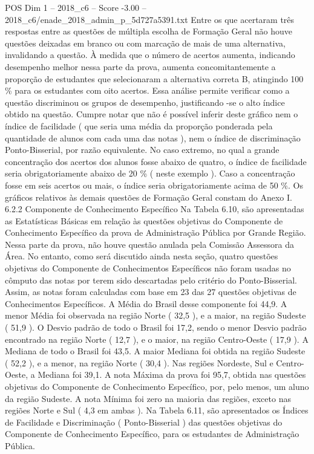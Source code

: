 \begin{textsample}{POS Dim 1 – 2018\_c6 – Score -3.00 – 2018\_c6/enade\_2018\_admin\_p\_5d727a5391.txt}
Entre os que acertaram três respostas entre as questões de múltipla escolha de Formação Geral não houve questões deixadas em branco ou com marcação de mais de uma alternativa, invalidando a questão.
À medida que o número de acertos aumenta, indicando desempenho melhor nessa parte da prova, aumenta concomitantemente a proporção de estudantes que selecionaram a alternativa correta B, atingindo 100 \% para os estudantes com oito acertos.
Essa análise permite verificar como a questão discriminou os grupos de desempenho, justificando -se o alto índice obtido na questão.
Cumpre notar que não é possível inferir deste gráfico nem o índice de facilidade ( que seria uma média da proporção ponderada pela quantidade de alunos com cada uma das notas ), nem o índice de discriminação Ponto-Bisserial, por razão equivalente.
No caso extremo, no qual a grande concentração dos acertos dos alunos fosse abaixo de quatro, o índice de facilidade seria obrigatoriamente abaixo de 20 \% ( neste exemplo ).
Caso a concentração fosse em seis acertos ou mais, o índice seria obrigatoriamente acima de 50 \%.
Os gráficos relativos às demais questões de Formação Geral constam do Anexo I. 6.2.2 Componente de Conhecimento Específico Na Tabela 6.10, são apresentadas as Estatísticas Básicas em relação às questões objetivas do Componente de Conhecimento Específico da prova de Administração Pública por Grande Região.
Nessa parte da prova, não houve questão anulada pela Comissão Assessora da Área.
No entanto, como será discutido ainda nesta seção, quatro questões objetivas do Componente de Conhecimentos Específicos não foram usadas no cômputo das notas por terem sido descartadas pelo critério do Ponto-Bisserial.
Assim, as notas foram calculadas com base em 23 das 27 questões objetivas de Conhecimentos Específicos.
A Média do Brasil desse componente foi 44,9.
A menor Média foi observada na região Norte ( 32,5 ), e a maior, na região Sudeste ( 51,9 ).
O Desvio padrão de todo o Brasil foi 17,2, sendo o menor Desvio padrão encontrado na região Norte ( 12,7 ), e o maior, na região Centro-Oeste ( 17,9 ).
A Mediana de todo o Brasil foi 43,5.
A maior Mediana foi obtida na região Sudeste ( 52,2 ), e a menor, na região Norte ( 30,4 ).
Nas regiões Nordeste, Sul e Centro-Oeste, a Mediana foi 39,1.
A nota Máxima da prova foi 95,7, obtida nas questões objetivas do Componente de Conhecimento Específico, por, pelo menos, um aluno da região Sudeste.
A nota Mínima foi zero na maioria das regiões, exceto nas regiões Norte e Sul ( 4,3 em ambas ).
Na Tabela 6.11, são apresentados os Índices de Facilidade e Discriminação ( Ponto-Bisserial ) das questões objetivas do Componente de Conhecimento Específico, para os estudantes de Administração Pública.

\end{textsample}

